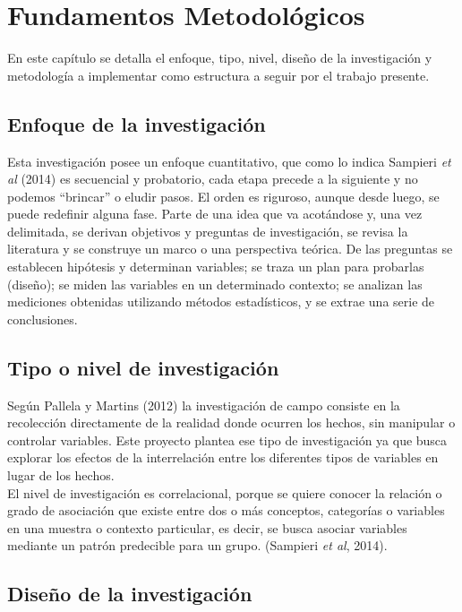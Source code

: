 \chapter{Fundamentos Metodol\'ogicos}
	
	En este capítulo se detalla el enfoque, tipo, nivel, diseño de la investigación y metodología a implementar como estructura a seguir por el trabajo presente. 
	
\section{Enfoque de la investigaci\'on}

	Esta investigación posee un enfoque cuantitativo, que como lo indica Sampieri \textit{et al} (2014) es  secuencial y probatorio, cada etapa precede a la siguiente y no podemos “brincar” o eludir pasos. El orden es riguroso, aunque desde luego, se puede redefinir alguna fase. Parte de una idea que va acotándose y, una vez delimitada, se derivan objetivos y preguntas de investigación, se revisa la literatura y se construye un marco o una perspectiva teórica. De las preguntas se establecen hipótesis y determinan variables; se traza un plan para probarlas (diseño); se miden las variables en un determinado contexto; se analizan las mediciones obtenidas utilizando métodos estadísticos, y se extrae una serie de conclusiones.\\
	
	
\section{Tipo o nivel de investigaci\'on}

Según Pallela y Martins (2012) la investigación de campo consiste en la recolección directamente de la realidad donde ocurren los hechos, sin manipular o controlar variables. Este proyecto plantea ese tipo de investigación ya que busca explorar los efectos de la interrelación entre los diferentes tipos de variables en lugar de los hechos.\\

El nivel de investigación es correlacional, porque se quiere conocer la relación o grado de asociación que existe entre dos o más conceptos, categorías o variables en una muestra o contexto particular, es decir, se busca asociar variables mediante un patrón predecible para un grupo. (Sampieri \textit{et al}, 2014).

	
\section{Dise\~no de la investigaci\'on}

